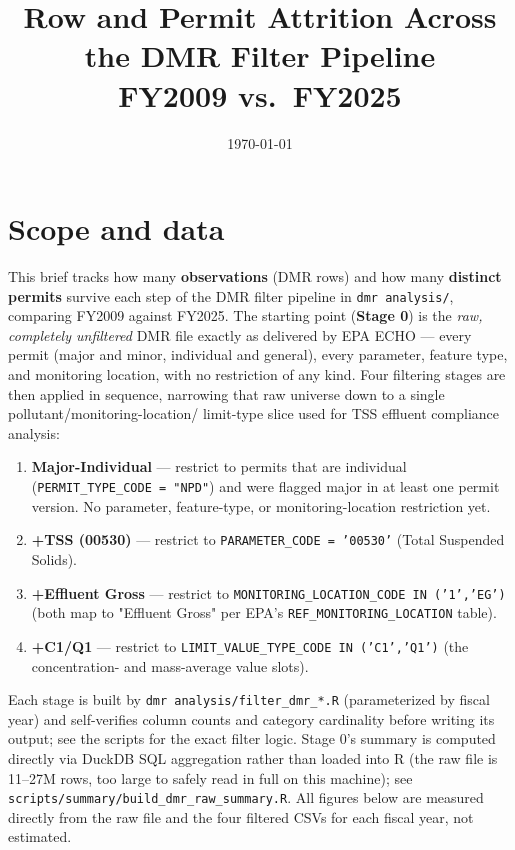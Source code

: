 \documentclass[11pt]{article}
\title{\vspace{-2.5em}Row and Permit Attrition Across the DMR Filter Pipeline\\
FY2009 vs.\ FY2025}
\author{}
\date{\today}
\begin{document}
\maketitle
\vspace{-2.5em}

\section*{Scope and data}
This brief tracks how many \textbf{observations} (DMR rows) and how many
\textbf{distinct permits} survive each step of the DMR filter pipeline in
\texttt{dmr analysis/}, comparing FY2009 against FY2025. The starting point
(\textbf{Stage 0}) is the \emph{raw, completely unfiltered} DMR file exactly
as delivered by EPA ECHO --- every permit (major and minor, individual and
general), every parameter, feature type, and monitoring location, with no
restriction of any kind. Four filtering stages are then applied in sequence,
narrowing that raw universe down to a single pollutant/monitoring-location/
limit-type slice used for TSS effluent compliance analysis:

\begin{enumerate}
  \item \textbf{Major-Individual} --- restrict to permits that are
        individual (\texttt{PERMIT\_TYPE\_CODE = "NPD"}) and were flagged
        major in at least one permit version. No parameter, feature-type, or
        monitoring-location restriction yet.
  \item \textbf{+TSS (00530)} --- restrict to \texttt{PARAMETER\_CODE =
        '00530'} (Total Suspended Solids).
  \item \textbf{+Effluent Gross} --- restrict to
        \texttt{MONITORING\_LOCATION\_CODE IN ('1','EG')} (both map to
        "Effluent Gross" per EPA's \texttt{REF\_MONITORING\_LOCATION} table).
  \item \textbf{+C1/Q1} --- restrict to \texttt{LIMIT\_VALUE\_TYPE\_CODE IN
        ('C1','Q1')} (the concentration- and mass-average value slots).
\end{enumerate}

Each stage is built by \texttt{dmr analysis/filter\_dmr\_*.R} (parameterized
by fiscal year) and self-verifies column counts and category cardinality
before writing its output; see the scripts for the exact filter logic. Stage
0's summary is computed directly via DuckDB SQL aggregation rather than
loaded into R (the raw file is 11--27M rows, too large to safely read in full
on this machine); see \texttt{scripts/summary/build\_dmr\_raw\_summary.R}.
All figures below are measured directly from the raw file and the four
filtered CSVs for each fiscal year, not estimated.
\end{document}
